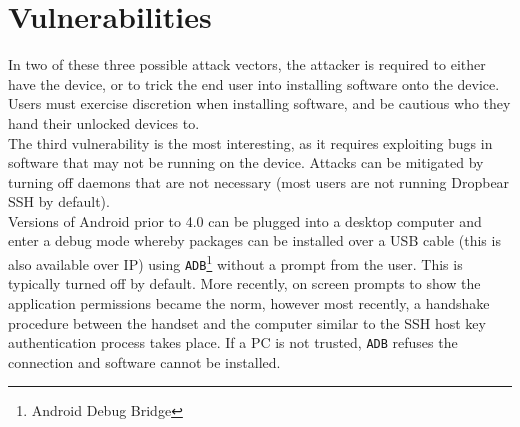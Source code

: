\documentclass[a4paper]{article}
\begin{document}
\section{Vulnerabilities}
\noindent In two of these three possible attack vectors, the attacker is
required to either have the device, or to trick the end user into installing software onto
the device.
\\
\noindent Users must exercise discretion when installing software, and be
cautious who they hand their unlocked devices to.
\\
\noindent The third vulnerability is the most interesting, as it requires
exploiting bugs in software that may not be running on the device. Attacks can be mitigated by
turning off daemons that are not necessary (most users are not running Dropbear
SSH by default).
\\
\noindent Versions of Android prior to 4.0 can be plugged into a desktop
computer and enter a debug mode whereby packages can be installed over a USB cable (this is
also available over IP) using \texttt{ADB}\footnote{Android Debug Bridge}
without a prompt from the user. This is typically turned off by default. More
recently, on screen prompts to show the application permissions became the norm,
however most recently, a handshake procedure between the handset and the
computer similar to the SSH host key authentication process takes place. If a PC
is not trusted, \texttt{ADB} refuses the connection and software cannot be
installed.
\end{document}

